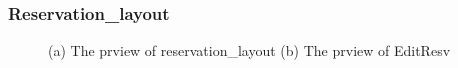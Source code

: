 \documentclass{article}
\begin{document}
\subsubsection*{Reservation\_layout}
\begin{figure}[htb]
  \vspace{\baselineskip}
  \begin{center}
      \caption{(a) The prview of reservation\_layout 
      (b) The prview of EditResv}
      \label{fig:frontend_reservation_browse_edit}
  \end{center}
  \vspace{-\baselineskip}
\end{figure}
\end{document}

